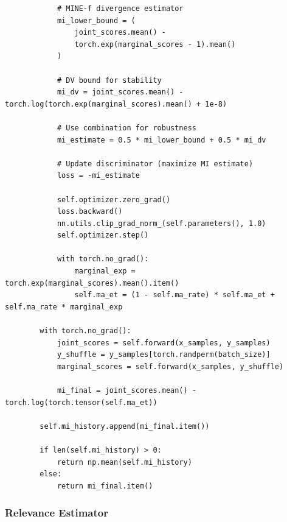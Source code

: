 \documentclass[10pt, letterpaper]{article}
\begin{document}
\begin{lstlisting}
            # MINE-f divergence estimator
            mi_lower_bound = (
                joint_scores.mean() -
                torch.exp(marginal_scores - 1).mean()
            )

            # DV bound for stability
            mi_dv = joint_scores.mean() - torch.log(torch.exp(marginal_scores).mean() + 1e-8)

            # Use combination for robustness
            mi_estimate = 0.5 * mi_lower_bound + 0.5 * mi_dv

            # Update discriminator (maximize MI estimate)
            loss = -mi_estimate

            self.optimizer.zero_grad()
            loss.backward()
            nn.utils.clip_grad_norm_(self.parameters(), 1.0)
            self.optimizer.step()

            with torch.no_grad():
                marginal_exp = torch.exp(marginal_scores).mean().item()
                self.ma_et = (1 - self.ma_rate) * self.ma_et + self.ma_rate * marginal_exp

        with torch.no_grad():
            joint_scores = self.forward(x_samples, y_samples)
            y_shuffle = y_samples[torch.randperm(batch_size)]
            marginal_scores = self.forward(x_samples, y_shuffle)

            mi_final = joint_scores.mean() - torch.log(torch.tensor(self.ma_et))

        self.mi_history.append(mi_final.item())

        if len(self.mi_history) > 0:
            return np.mean(self.mi_history)
        else:
            return mi_final.item()
\end{lstlisting}

\subsubsection{Relevance Estimator}
\end{document}
